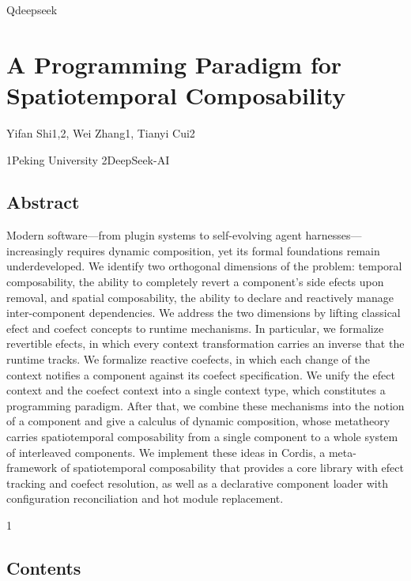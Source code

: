 \documentclass[
  10
]{article}
\author{}
\date{}
\begin{document}
Qdeepseek

\section{A Programming Paradigm for Spatiotemporal
Composability}\label{a-programming-paradigm-for-spatiotemporal-composability}

Yifan Shi1,2, Wei Zhang1, Tianyi Cui2

1Peking University 2DeepSeek-AI

\subsection{Abstract}\label{abstract}

Modern software---from plugin systems to self-evolving agent
harnesses---increasingly requires dynamic composition, yet its formal
foundations remain underdeveloped. We identify two orthogonal dimensions
of the problem: temporal composability, the ability to completely revert
a component's side efects upon removal, and spatial composability, the
ability to declare and reactively manage inter-component dependencies.
We address the two dimensions by lifting classical efect and coefect
concepts to runtime mechanisms. In particular, we formalize revertible
efects, in which every context transformation carries an inverse that
the runtime tracks. We formalize reactive coefects, in which each change
of the context notifies a component against its coefect specification.
We unify the efect context and the coefect context into a single context
type, which constitutes a programming paradigm. After that, we combine
these mechanisms into the notion of a component and give a calculus of
dynamic composition, whose metatheory carries spatiotemporal
composability from a single component to a whole system of interleaved
components. We implement these ideas in Cordis, a meta-framework of
spatiotemporal composability that provides a core library with efect
tracking and coefect resolution, as well as a declarative component
loader with configuration reconciliation and hot module replacement.

1

\subsection{Contents}\label{contents}
\end{document}
